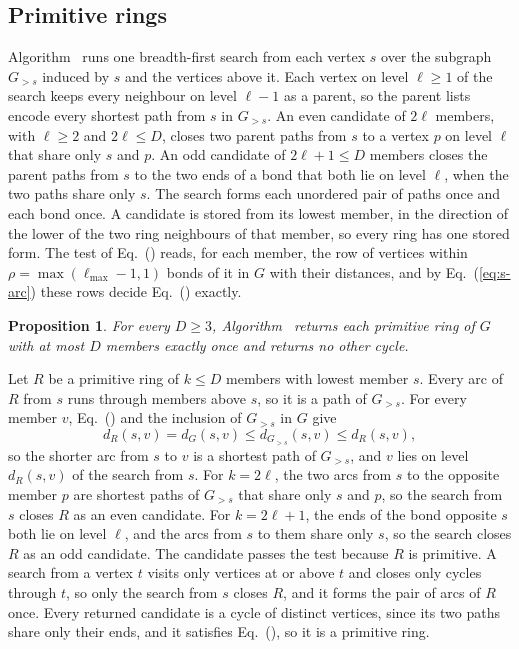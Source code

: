 \documentclass[preprint,12pt]{elsarticle}
\newtheorem{proposition}{Proposition}
\begin{document}
\subsection{Primitive rings}
\label{sec:s-rings}

Algorithm~ runs one breadth-first search from each vertex $s$ over the subgraph $G_{>s}$ induced by $s$ and the vertices above it.
Each vertex on level $\ell\ge 1$ of the search keeps every neighbour on level $\ell-1$ as a parent, so the parent lists encode every shortest path from $s$ in $G_{>s}$.
An even candidate of $2\ell$ members, with $\ell\ge 2$ and $2\ell\le D$, closes two parent paths from $s$ to a vertex $p$ on level $\ell$ that share only $s$ and $p$.
An odd candidate of $2\ell+1\le D$ members closes the parent paths from $s$ to the two ends of a bond that both lie on level $\ell$, when the two paths share only $s$.
The search forms each unordered pair of paths once and each bond once.
A candidate is stored from its lowest member, in the direction of the lower of the two ring neighbours of that member, so every ring has one stored form.
The test of Eq.~() reads, for each member, the row of vertices within $\rho=\max(\ell_{\max}-1,1)$ bonds of it in $G$ with their distances, and by Eq.~(\ref{eq:s-arc}) these rows decide Eq.~() exactly.

\begin{proposition}
\label{prop:s-rings} For every $D\ge 3$, Algorithm~ returns each primitive ring of $G$ with at most $D$ members exactly once and returns no other cycle.
\end{proposition}

\begin{pf}
Let $R$ be a primitive ring of $k\le D$ members with lowest member $s$.
Every arc of $R$ from $s$ runs through members above $s$, so it is a path of $G_{>s}$.
For every member $v$, Eq.~() and the inclusion of $G_{>s}$ in $G$ give
\begin{equation*}
  d_R(s,v)=d_G(s,v)\le d_{G_{>s}}(s,v)\le d_R(s,v),
\end{equation*}
so the shorter arc from $s$ to $v$ is a shortest path of $G_{>s}$, and $v$ lies on level $d_R(s,v)$ of the search from $s$.
For $k=2\ell$, the two arcs from $s$ to the opposite member $p$ are shortest paths of $G_{>s}$ that share only $s$ and $p$, so the search from $s$ closes $R$ as an even candidate.
For $k=2\ell+1$, the ends of the bond opposite $s$ both lie on level $\ell$, and the arcs from $s$ to them share only $s$, so the search closes $R$ as an odd candidate.
The candidate passes the test because $R$ is primitive.
A search from a vertex $t$ visits only vertices at or above $t$ and closes only cycles through $t$, so only the search from $s$ closes $R$, and it forms the pair of arcs of $R$ once.
Every returned candidate is a cycle of distinct vertices, since its two paths share only their ends, and it satisfies Eq.~(), so it is a primitive ring.
\end{pf}
\end{document}
